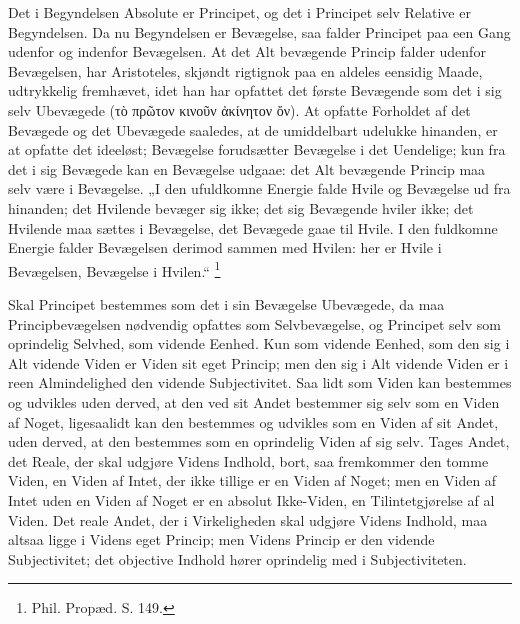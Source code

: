 \documentclass[11pt]{book}
\newcommand{\opage}[1]{\marginnote{\footnotesize\textit{[#1]}}}
\begin{document}
Det i Begyndelsen Absolute er Principet, og det i Principet selv
Relative er Begyndelsen. Da nu Begyndelsen er Bevægelse, saa falder
Principet paa een Gang udenfor og indenfor Bevægelsen. At det Alt
bevægende Princip falder udenfor Bevægelsen, har Aristoteles, skjøndt
rigtignok paa en aldeles eensidig Maade, udtrykkelig fremhævet, idet
han har opfattet det første Bevægende som det i sig selv Ubevægede
(τὸ πρῶτον κινοῦν ἀκίνητον ὄν). At opfatte Forholdet
\opage{8} \setcounter{footnote}{0}%
af det Bevægede og det Ubevægede saaledes, at de umiddelbart udelukke
hinanden, er at opfatte det ideeløst; Bevægelse forudsætter Bevægelse i
det Uendelige; kun fra det i sig Bevægede kan en Bevægelse udgaae: det
Alt bevægende Princip maa selv være i Bevægelse. „I den ufuldkomne
Energie falde Hvile og Bevægelse ud fra hinanden; det Hvilende bevæger
sig ikke; det sig Bevægende hviler ikke; det Hvilende maa sættes i
Bevægelse, det Bevægede gaae til Hvile. I den fuldkomne Energie falder
Bevægelsen derimod sammen med Hvilen: her er Hvile i Bevægelsen,
Bevægelse i Hvilen.“%
\footnote{Phil. Propæd. S. 149.}

Skal Principet bestemmes som det i sin Bevægelse Ubevægede, da maa
Principbevægelsen nødvendig opfattes som Selvbevægelse, og Principet
selv som oprindelig Selvhed, som vidende Eenhed. Kun som vidende
Eenhed, som den sig i Alt vidende Viden er Viden sit eget Princip; men
den sig i Alt vidende Viden er i reen Almindelighed den vidende
Subjectivitet. Saa lidt som Viden kan bestemmes og udvikles uden
derved, at den ved sit Andet bestemmer sig selv som en Viden af Noget,
ligesaalidt kan den bestemmes og udvikles som en Viden af sit Andet,
uden derved, at den bestemmes som en oprindelig Viden af sig selv.
Tages Andet, det Reale, der skal udgjøre Videns Indhold, bort, saa
fremkommer den tomme Viden, en Viden af Intet, der ikke tillige er en
Viden af Noget; men en Viden af Intet uden en Viden af Noget er en
absolut Ikke-Viden, en Tilintetgjørelse af al Viden. Det reale Andet,
der i Virkeligheden skal udgjøre Videns Indhold, maa altsaa ligge i
Videns eget Princip; men Videns Princip er den vidende Subjectivitet;
det objective Indhold hører oprindelig med i Subjectiviteten.
\end{document}
